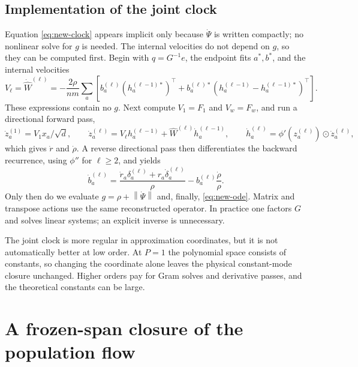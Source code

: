 \documentclass[11pt]{article}
\theoremstyle{definition}
\theoremstyle{remark}
\newcommand{\norm}[1]{\left\lVert #1\right\rVert}
\newcommand{\od}{\mathbin{\odot}}
\begin{document}
\subsection*{Implementation of the joint clock}
\label{app:joint-impl}

Equation \eqref{eq:new-clock} appears implicit only because $\dot\Psi$ is
written compactly; no nonlinear solve for $g$ is needed.  The internal
velocities do not depend on $g$, so they can be computed first.  Begin with
$q=G^{-1}e$, the endpoint fits $a^*,b^*$, and the internal velocities
\begin{equation}
 V_\ell=\dot{\widehat W}^{(\ell)}=-\frac{2\rho}{nm}\sum_a
 \left[b^{(\ell)}_a(h^{(\ell-1)*}_a)^\top+
 b^{(\ell)*}_a(h^{(\ell-1)}_a-h^{(\ell-1)*}_a)^\top\right]. \label{eq:internal-velocity}
\end{equation}
These expressions contain no $g$.  Next compute $V_1=F_1$ and $V_w=F_w$, and run
a directional forward pass,
\[
 \dot z_a^{(1)}=V_1x_a/\sqrt d,\qquad
 \dot z_a^{(\ell)}=V_\ell h_a^{(\ell-1)}+
 \widehat W^{(\ell)}\dot h_a^{(\ell-1)},\qquad
 \dot h_a^{(\ell)}=\phi'(z_a^{(\ell)})\od\dot z_a^{(\ell)},
\]
which gives $\dot r$ and $\dot\rho$.  A reverse directional pass then
differentiates the backward recurrence, using $\phi''$ for $\ell\ge2$, and
yields
\[
 \dot b^{(\ell)}_a=\frac{\dot r_a\delta_a^{(\ell)}+
 r_a\dot\delta_a^{(\ell)}}{\rho}-b^{(\ell)}_a\frac{\dot\rho}{\rho}.
\]
Only then do we evaluate $g=\rho+\norm{\dot\Psi}$ and, finally,
\eqref{eq:new-ode}.  Matrix and transpose actions use the same reconstructed
operator.  In practice one factors $G$ and solves linear systems; an explicit
inverse is unnecessary.

The joint clock is more regular in approximation coordinates, but it is not
automatically better at low order.  At $P=1$ the polynomial space consists of
constants, so changing the coordinate alone leaves the physical constant-mode
closure unchanged.  Higher orders pay for Gram solves and derivative passes,
and the theoretical constants can be large.

\section{A frozen-span closure of the population flow}
\label{app:popclosure}
\end{document}
